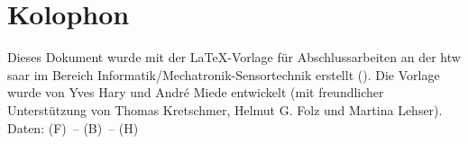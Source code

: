 \pagestyle{empty}

\hfill

\vfill


\section*{Kolophon}
Dieses Dokument wurde mit der \LaTeX-Vorlage für Abschlussarbeiten an der htw saar im Bereich Informatik/Mechatronik-Sensortechnik erstellt (\currentVersion). Die Vorlage wurde von Yves Hary und Andr\'e Miede entwickelt (mit freundlicher Unterstützung von Thomas Kretschmer, Helmut G. Folz und Martina Lehser). Daten: (F)\makeatletter\f@size\makeatother\ -- (B)\the\textwidth\ -- (H)\the\textheight\ 

